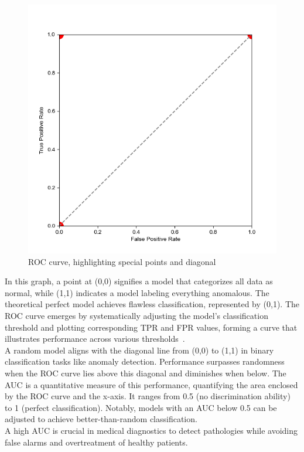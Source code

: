 \begin{figure}[h!]
  \centering
  \includegraphics[width=0.5\linewidth]{images/rocauc}
  \caption{
  ROC curve, highlighting special points and diagonal
}
\end{figure}

In this graph, a point at (0,0) signifies a model that categorizes all data as normal, while (1,1) indicates a model labeling everything anomalous. The theoretical perfect model achieves flawless classification, represented by (0,1). The ROC curve emerges by systematically adjusting the model's classification threshold and plotting corresponding TPR and FPR values, forming a curve that illustrates performance across various thresholds~\cite{fawcett2006introduction}.\\
A random model aligns with the diagonal line from (0,0) to (1,1) in binary classification tasks like anomaly detection. Performance surpasses randomness when the ROC curve lies above this diagonal and diminishes when below. The AUC is a quantitative measure of this performance, quantifying the area enclosed by the ROC curve and the x-axis. It ranges from 0.5 (no discrimination ability) to 1 (perfect classification). Notably, models with an AUC below 0.5 can be adjusted to achieve better-than-random classification.\\
A high AUC is crucial in medical diagnostics to detect pathologies while avoiding false alarms and overtreatment of healthy patients.


